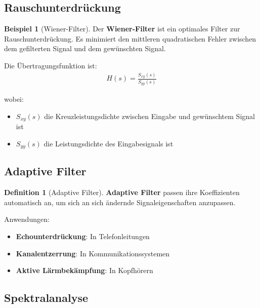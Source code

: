 ﻿\documentclass[a4paper,12pt]{report}
\theoremstyle{definition}
\newtheorem{definition}{Definition}
\newtheorem{beispiel}{Beispiel}
\begin{document}
	\subsection{Rauschunterdrückung}
	
	\begin{beispiel}[Wiener-Filter]
		Der \textbf{Wiener-Filter} ist ein optimales Filter zur Rauschunterdrückung. Es minimiert den mittleren quadratischen Fehler zwischen dem gefilterten Signal und dem gewünschten Signal.
		
		Die Übertragungsfunktion ist:
		\begin{align}
			H(s) = \frac{S_{xy}(s)}{S_{yy}(s)}
		\end{align}
		
		wobei:
		\begin{itemize}
			\item[-] $S_{xy}(s)$ die Kreuzleistungsdichte zwischen Eingabe und gewünschtem Signal ist
			\item[-] $S_{yy}(s)$ die Leistungsdichte des Eingabesignals ist
		\end{itemize}
	\end{beispiel}
	
	\subsection{Adaptive Filter}
	
	\begin{definition}[Adaptive Filter]
		\textbf{Adaptive Filter} passen ihre Koeffizienten automatisch an, um sich an sich ändernde Signaleigenschaften anzupassen.
		
		Anwendungen:
		\begin{itemize}
			\item[-] \textbf{Echounterdrückung}: In Telefonleitungen
			\item[-] \textbf{Kanalentzerrung}: In Kommunikationssystemen
			\item[-] \textbf{Aktive Lärmbekämpfung}: In Kopfhörern
		\end{itemize}
	\end{definition}
	
	\subsection{Spektralanalyse}
	
\end{document}
